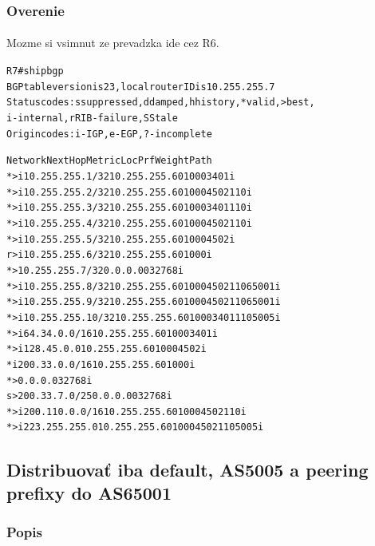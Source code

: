 \documentclass[12pt,twoside,a4paper]{report}
\begin{document}
\subsubsection{Overenie}
\paragraph{}
Mozme si vsimnut ze prevadzka ide cez R6.

\noindent
{\selectfont
\begin{small}
\begin{alltt}
R7#sh ip bgp
BGP table version is 23, local router ID is 10.255.255.7
Status codes: s suppressed, d damped, h history, * valid, > best, 
              i - internal, r RIB-failure, S Stale
Origin codes: i - IGP, e - EGP, ? - incomplete

   Network          Next Hop        Metric LocPrf Weight Path
*>i10.255.255.1/32  10.255.255.6         0    100      0 3401 i
*>i10.255.255.2/32  10.255.255.6         0    100      0 4502 110 i
*>i10.255.255.3/32  10.255.255.6         0    100      0 3401 110 i
*>i10.255.255.4/32  10.255.255.6         0    100      0 4502 110 i
*>i10.255.255.5/32  10.255.255.6         0    100      0 4502 i
r>i10.255.255.6/32  10.255.255.6         0    100      0 i
*> 10.255.255.7/32  0.0.0.0              0         32768 i
*>i10.255.255.8/32  10.255.255.6         0    100      0 4502 110 65001 i
*>i10.255.255.9/32  10.255.255.6         0    100      0 4502 110 65001 i
*>i10.255.255.10/32 10.255.255.6         0    100      0 3401 110 5005 i
*>i64.34.0.0/16     10.255.255.6         0    100      0 3401 i
*>i128.45.0.0       10.255.255.6         0    100      0 4502 i
* i200.33.0.0/16    10.255.255.6         0    100      0 i
*>                  0.0.0.0                        32768 i
s> 200.33.7.0/25    0.0.0.0              0         32768 i
*>i200.110.0.0/16   10.255.255.6         0    100      0 4502 110 i
*>i223.255.255.0    10.255.255.6         0    100      0 4502 110 5005 i
\end{alltt}
\end{small}
}




\subsection{Distribuovať iba default, AS5005 a peering prefixy do AS65001}
\subsubsection{Popis}
\end{document}
